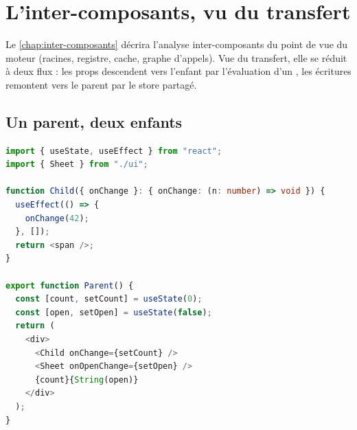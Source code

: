 \section{L'inter-composants, vu du transfert}
\label{sec:transfert-stores-inter}

Le \cref{chap:inter-composants} décrira l'analyse inter-composants du point
de vue du moteur (racines, registre, cache, graphe d'appels). Vue du
transfert, elle se réduit à deux flux : les props descendent vers l'enfant
par l'évaluation d'un , les écritures remontent vers le
parent par le store partagé.

\subsection{Un parent, deux enfants}

\begin{lstlisting}[language=TypeScript,caption={Un enfant connu, un enfant inconnu (\file{/tmp/ch11/ex13.tsx})},label={lst:transfert-stores-parent}]
import { useState, useEffect } from "react";
import { Sheet } from "./ui";

function Child({ onChange }: { onChange: (n: number) => void }) {
  useEffect(() => {
    onChange(42);
  }, []);
  return <span />;
}

export function Parent() {
  const [count, setCount] = useState(0);
  const [open, setOpen] = useState(false);
  return (
    <div>
      <Child onChange={setCount} />
      <Sheet onOpenChange={setOpen} />
      {count}{String(open)}
    </div>
  );
}
\end{lstlisting}


